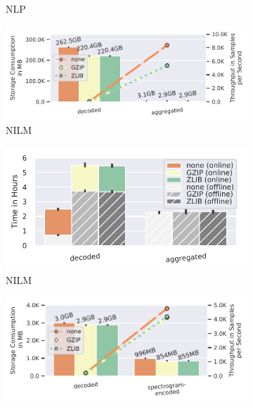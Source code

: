{\begin{figure}
\begin{subfigure}[c]{0.21\textwidth}
        \vspace{-18pt}
        \caption{NLP}
        \label{fig:compressed-processing-time-nlp}
    \end{subfigure}
    \begin{subfigure}[c]{0.26\textwidth}
        \includegraphics[width=\textwidth]{figures/cream-pipeline/compressed-storage-vs-throughput.pdf}
        \vspace{-18pt}
        \caption{NILM}
        \label{fig:compressed-storage-vs-throughput-nilm}
    \end{subfigure}
    \begin{subfigure}[c]{0.21\textwidth}
        \includegraphics[width=\textwidth]{figures/cream-pipeline/compression-processing-time-split.pdf}
        \vspace{-18pt}
        \caption{NILM}
        \label{fig:compressed-processing-time-nilm}
    \end{subfigure}
    \begin{subfigure}[c]{0.26\textwidth}
        \includegraphics[width=\textwidth]{figures/commonvoice-pipeline/compressed-storage-vs-throughput.pdf}

\end{subfigure}
\end{figure}}

